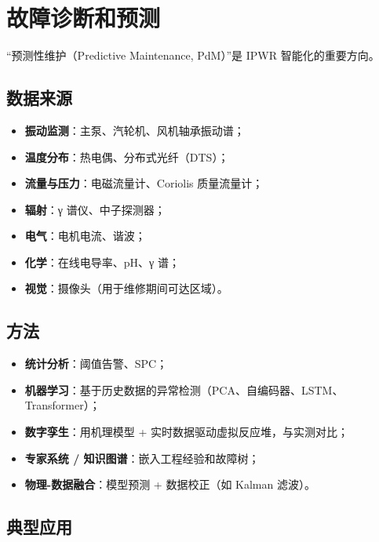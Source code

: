 \documentclass[
  UTF8,
  scheme=plain,
  fontsize=10pt,
  openany
]{ctexbook}
\begin{document}
\section{故障诊断和预测}\label{ux6545ux969cux8bcaux65adux548cux9884ux6d4b}

``预测性维护（Predictive Maintenance, PdM）''是 IPWR 智能化的重要方向。

\subsection{数据来源}\label{ux6570ux636eux6765ux6e90}

\begin{itemize}
\tightlist
\item
  \textbf{振动监测}：主泵、汽轮机、风机轴承振动谱；
\item
  \textbf{温度分布}：热电偶、分布式光纤（DTS）；
\item
  \textbf{流量与压力}：电磁流量计、Coriolis 质量流量计；
\item
  \textbf{辐射}：γ 谱仪、中子探测器；
\item
  \textbf{电气}：电机电流、谐波；
\item
  \textbf{化学}：在线电导率、pH、γ 谱；
\item
  \textbf{视觉}：摄像头（用于维修期间可达区域）。
\end{itemize}

\subsection{方法}\label{ux65b9ux6cd5}

\begin{itemize}
\tightlist
\item
  \textbf{统计分析}：阈值告警、SPC；
\item
  \textbf{机器学习}：基于历史数据的异常检测（PCA、自编码器、LSTM、Transformer）；
\item
  \textbf{数字孪生}：用机理模型 + 实时数据驱动虚拟反应堆，与实测对比；
\item
  \textbf{专家系统 / 知识图谱}：嵌入工程经验和故障树；
\item
  \textbf{物理-数据融合}：模型预测 + 数据校正（如 Kalman 滤波）。
\end{itemize}

\subsection{典型应用}\label{ux5178ux578bux5e94ux7528}
\end{document}
